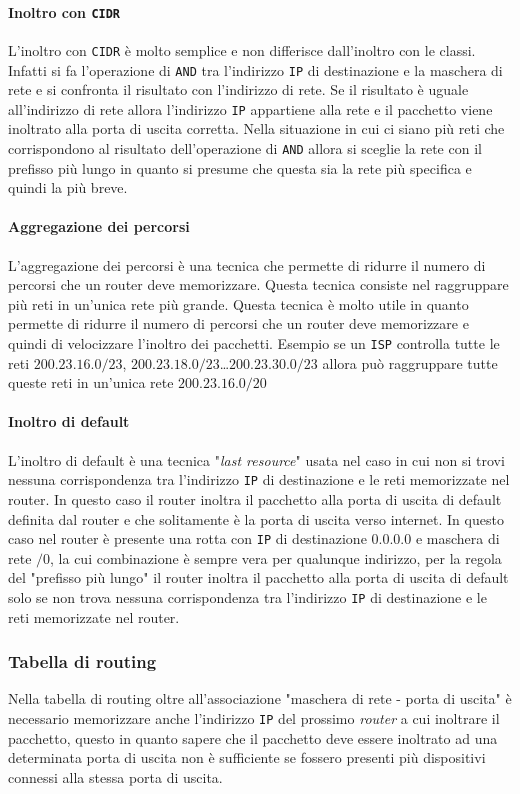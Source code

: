             \paragraph{Inoltro con \texttt{CIDR}} L'inoltro con \texttt{CIDR} è molto semplice e non differisce dall'inoltro con le classi. Infatti si fa l'operazione di \texttt{AND} tra l'indirizzo \texttt{IP} di destinazione e la maschera di rete e si confronta il risultato con l'indirizzo di rete. Se il risultato è uguale all'indirizzo di rete allora l'indirizzo \texttt{IP} appartiene alla rete e il pacchetto viene inoltrato alla porta di uscita corretta. Nella situazione in cui ci siano più reti che corrispondono al risultato dell'operazione di \texttt{AND} allora si sceglie la rete con il prefisso più lungo in quanto si presume che questa sia la rete più specifica e quindi la più breve.
            \paragraph{Aggregazione dei percorsi} L'aggregazione dei percorsi è una tecnica che permette di ridurre il numero di percorsi che un router deve memorizzare. Questa tecnica consiste nel raggruppare più reti in un'unica rete più grande. Questa tecnica è molto utile in quanto permette di ridurre il numero di percorsi che un router deve memorizzare e quindi di velocizzare l'inoltro dei pacchetti. Esempio se un \texttt{ISP} controlla tutte le reti $200.23.16.0/23$, $200.23.18.0/23$\dots $200.23.30.0/23$ allora può raggruppare tutte queste reti in un'unica rete $200.23.16.0/20$
            \paragraph{Inoltro di default} L'inoltro di default è una tecnica "\textit{last resource}" usata nel caso in cui non si trovi nessuna corrispondenza tra l'indirizzo \texttt{IP} di destinazione e le reti memorizzate nel router. In questo caso il router inoltra il pacchetto alla porta di uscita di default definita dal router e che solitamente è la porta di uscita verso internet. In questo caso nel router è presente una rotta con \texttt{IP} di destinazione $0.0.0.0$ e maschera di rete $/0$, la cui combinazione è sempre vera per qualunque indirizzo, per la regola del "prefisso più lungo" il router inoltra il pacchetto alla porta di uscita di default solo se non trova nessuna corrispondenza tra l'indirizzo \texttt{IP} di destinazione e le reti memorizzate nel router.
        \subsubsection{Tabella di routing}
            Nella tabella di routing oltre all'associazione "maschera di rete - porta di uscita" è necessario memorizzare anche l'indirizzo \texttt{IP} del prossimo \textit{router} a cui inoltrare il pacchetto, questo in quanto sapere che il pacchetto deve essere inoltrato ad una determinata porta di uscita non è sufficiente se fossero presenti più dispositivi connessi alla stessa porta di uscita.
